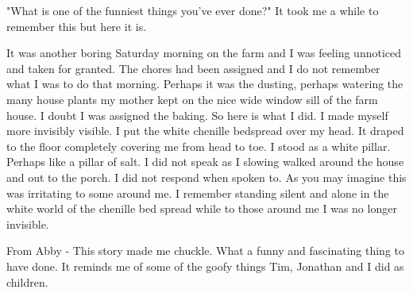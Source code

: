 "What is one of the funniest things you've ever done?"
It took me a while to remember this but here it is.

It was another boring Saturday morning on the farm and I was feeling unnoticed and taken for granted.
The chores had been assigned and I do not remember what I was to do that morning.
Perhaps it was the dusting, perhaps watering the many house plants my mother kept on the nice wide window sill of the farm house.
I doubt I was assigned the baking.
So here is what I did.
I made myself more invisibly visible.
I put the white chenille bedspread over my head.
It draped to the floor completely covering me from head to toe.
I stood as a white pillar.
Perhaps like a pillar of salt.
I did not speak as I slowing walked around the house and out to the porch.
I did not respond when spoken to.
As you may imagine this was irritating to some around me.
I remember standing silent and alone in the white world of the chenille bed spread while to those around me I was no longer invisible.

From Abby - This story made me chuckle.
What a funny and fascinating thing to have done.
It reminds me of some of the goofy things Tim, Jonathan and I did as children.





